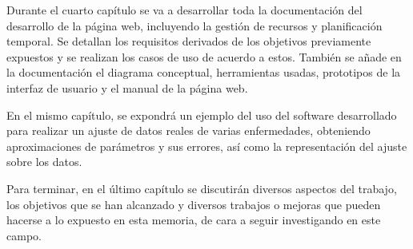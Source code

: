 Durante el cuarto capítulo se va a desarrollar toda la documentación del desarrollo de la página web, incluyendo la gestión de recursos y planificación temporal. Se detallan los requisitos derivados de los objetivos previamente expuestos y se realizan los casos de uso de acuerdo a estos. También se añade en la documentación el diagrama conceptual, herramientas usadas, prototipos de la interfaz de usuario y el manual de la página web.

En el mismo capítulo, se expondrá un ejemplo del uso del software desarrollado para realizar un ajuste de datos reales de varias enfermedades, obteniendo aproximaciones de parámetros y sus errores, así como la representación del ajuste sobre los datos.

Para terminar, en el último capítulo se discutirán diversos aspectos del trabajo, los objetivos que se han alcanzado y diversos trabajos o mejoras que pueden hacerse a lo expuesto en esta memoria, de cara a seguir investigando en este campo.


